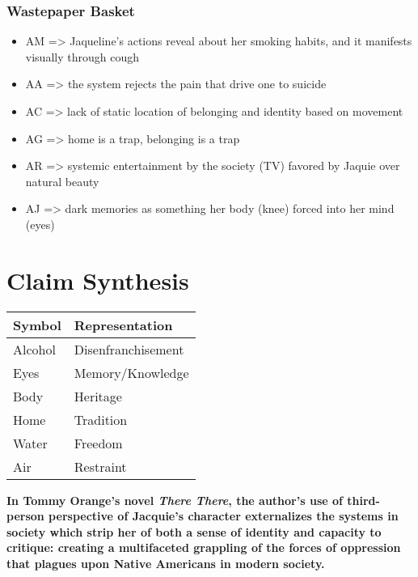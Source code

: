 \documentclass[letterpaper]{article}
\begin{document}
\subsubsection{Wastepaper Basket}
\label{sec:org47d095c}
\begin{itemize}
\item AM => Jaqueline's actions reveal about her smoking habits, and it manifests visually through cough
\item AA => the system rejects the pain that drive one to suicide
\item AC => lack of static location of belonging and identity based on movement
\item AG => home is a trap, belonging is a trap
\item AR => systemic entertainment by the society (TV) favored by Jaquie over natural beauty
\item AJ => dark memories as something her body (knee) forced into her mind (eyes)
\end{itemize}



\section{Claim Synthesis}
\label{sec:org73014d5}

\begin{center}
\begin{tabular}{ll}
Symbol & Representation\\
\hline
Alcohol & Disenfranchisement\\
Eyes & Memory/Knowledge\\
Body & Heritage\\
Home & Tradition\\
Water & Freedom\\
Air & Restraint\\
\end{tabular}
\end{center}

\textbf{In Tommy Orange's novel \emph{There There}, the author's use of third-person perspective of Jacquie's character externalizes the systems in society which strip her of both a sense of identity and capacity to critique: creating a multifaceted grappling of the forces of oppression that plagues upon Native Americans in modern society.}
\end{document}
